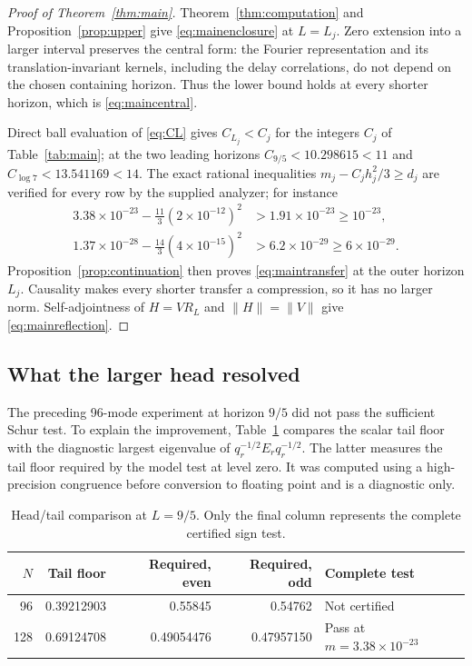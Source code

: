 \documentclass[11pt]{article}
\numberwithin{equation}{section}
\theoremstyle{definition}
\theoremstyle{remark}
\newcommand{\norm}[1]{\lVert#1\rVert}
\begin{document}
\begin{proof}[Proof of Theorem~\ref{thm:main}]
Theorem~\ref{thm:computation} and Proposition~\ref{prop:upper} give
\eqref{eq:mainenclosure} at $L=L_j$. Zero extension into a larger interval
preserves the central form: the Fourier representation and its
translation-invariant kernels, including the delay correlations, do not depend
on the chosen containing horizon. Thus the lower bound holds at every shorter
horizon, which is \eqref{eq:maincentral}.

Direct ball evaluation of \eqref{eq:CL} gives $C_{L_j}<C_j$ for the integers
$C_j$ of Table~\ref{tab:main}; at the two leading horizons
$C_{9/5}<10.298615<11$ and $C_{\log7}<13.541169<14$. The exact rational
inequalities $m_j-C_jh_j^2/3\ge d_j$ are verified for every row by the
supplied analyzer; for instance
\begin{align*}
 3.38\times10^{-23}-\tfrac{11}{3}(2\times10^{-12})^2
 &>1.91\times10^{-23}\ge10^{-23},\\
 1.37\times10^{-28}-\tfrac{14}{3}(4\times10^{-15})^2
 &>6.2\times10^{-29}\ge6\times10^{-29}.
\end{align*}
Proposition~\ref{prop:continuation} then proves \eqref{eq:maintransfer} at
the outer horizon $L_j$. Causality makes every shorter transfer a compression,
so it has no larger norm. Self-adjointness of $H=VR_L$ and
$\norm H=\norm V$ give \eqref{eq:mainreflection}.
\end{proof}

\subsection{What the larger head resolved}

The preceding 96-mode experiment at horizon $9/5$ did not pass the
sufficient Schur test. To explain the improvement, Table~\ref{tab:diagnostic}
compares the scalar tail floor with the diagnostic largest eigenvalue of
$q_r^{-1/2}E_rq_r^{-1/2}$. The latter measures the tail floor required by
the model test at level zero. It was computed using a high-precision
congruence before conversion to floating point and is a diagnostic only.

\begin{table}[ht]
\centering
\caption{Head/tail comparison at $L=9/5$. Only the final column represents
the complete certified sign test.}
\label{tab:diagnostic}
\begin{tabular}{@{}rrrrl@{}}
\toprule
$N$ & Tail floor & Required, even & Required, odd & Complete test\\
\midrule
96 & 0.39212903 & 0.55845 & 0.54762 & Not certified\\
128 & 0.69124708 & 0.49054476 & 0.47957150 & Pass at $m=3.38\times10^{-23}$\\
\bottomrule
\end{tabular}
\end{table}
\end{document}
